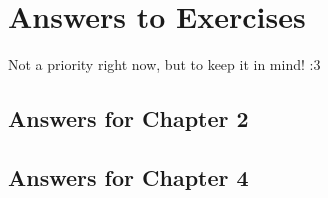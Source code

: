 \chapter{Answers to Exercises}
\label{Answers}

Not a priority right now, but to keep it in mind! :3

\section*{Answers for Chapter 2}

\section*{Answers for Chapter 4}